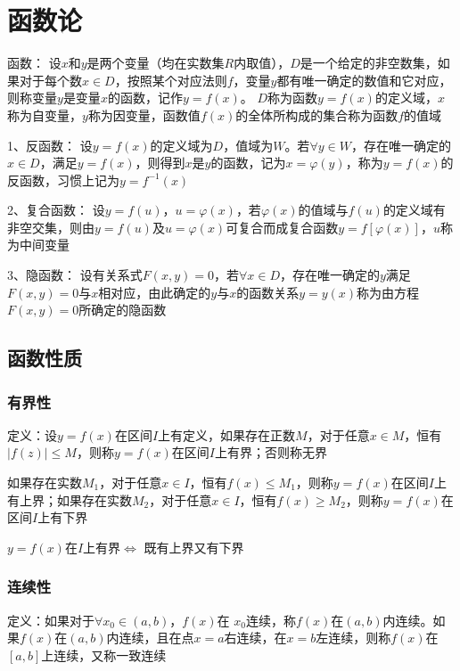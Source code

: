 \documentclass[12pt]{book}
\begin{document}
\chapter{函数论}




函数：
设$x$和$y$是两个变量（均在实数集$R$内取值），$D$是一个给定的非空数集，如果对于每个数$x\in D$，按照某个对应法则$f$，变量$y$都有唯一确定的数值和它对应，则称变量$y$是变量$x$的函数，记作$y= f(x)$。
$D$称为函数$y= f(x)$的定义域，$x$称为自变量，$y$称为因变量，函数值$ f(x)$的全体所构成的集合称为函数$f$的值域

1、反函数：
设$y= f(x)$的定义域为$D$，值域为$W$。若$\forall y \in W$，存在唯一确定的$x \in D$，满足$y= f(x)$，则得到$x$是$y$的函数，记为$ x =\varphi(y)$，称为$y= f(x)$的反函数，习惯上记为$ y= f^{-1}(x)$

2、复合函数：
设$ y = f(u)$，$u=\varphi(x)$，若$\varphi(x)$的值域与$f(u)$的定义域有非空交集，则由$ y = f(u)$及$u=\varphi(x)$可复合而成复合函数$ y = f[\varphi(x)]$，$u$称为中间变量

3、隐函数：
设有关系式$ F(x,y)=0$，若$\forall x\in D$，存在唯一确定的$y$满足$F(x,y)= 0$与$x$相对应，由此确定的$y$与$ x $的函数关系$y = y(x)$称为由方程$  F(x,y)= 0  $所确定的隐函数






\section{函数性质}


\subsection{有界性}

定义：设$y=f(x)$在区间$I$上有定义，如果存在正数$M$，对于任意$ x \in M$，恒有$|f(z)|\leq M$，则称$y=f(x)$在区间$I$上有界；否则称无界

如果存在实数$M_1$，对于任意$x\in I$，恒有$f(x)\leq M_1$，则称$y=f(x)$在区间$I$上有上界；如果存在实数$ M_2$，对于任意$x\in  I$，恒有$ f(x)\geq M_2$，则称$y=f(x)$在区间$I$上有下界

$y=f(x)$在$I$上有界$\Leftrightarrow$ 既有上界又有下界

\subsection{连续性}

定义：如果对于$\forall x_0\in (a,b)$，$f(x)$在 $x_0$连续，称$f(x)$在$(a,b)$内连续。如果$f(x)$在$(a,b)$内连续，且在点$x=a$右连续，在$x=b$左连续，则称$f(x)$在$[a,b]$上连续，又称一致连续
\end{document}
